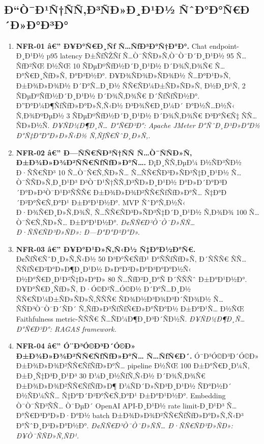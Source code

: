 \documentclass[12pt,A4]{report}
\begin{document}
\subsection{Ð“Ò¯Ð¹Ñ†ÑÑ‚Ð³ÑÐ»Ð¸Ð¹Ð½ ÑˆÐ°Ð°Ñ€Ð´Ð»Ð°Ð³Ð°}

\begin{enumerate}

  \item \textbf{NFR-01 â€” Ð¥Ð°Ñ€Ð¸Ñƒ Ñ…ÑƒÐ³Ð°Ñ†Ð°Ð°.}
        Chat endpoint-Ð¸Ð¹Ð½ p95 latency Ð±ÑƒÑŽÑƒ Ñ…Ò¯ÑÑÐ»Ñ‚Ò¯Ò¯Ð´Ð¸Ð¹Ð½
        95 Ñ…ÑƒÐ²ÑŒ Ð½ÑŒ 10 ÑÐµÐºÑƒÐ½Ð´Ð¸Ð¹Ð½ Ð´Ð¾Ñ‚Ð¾Ñ€ Ñ…Ð°Ñ€Ð¸ÑƒÐ»Ñ‚ Ð°Ð²Ð½Ð°.
        Ð¥Ð¾ÑÐ¾Ð»ÑÐ¾Ð½ Ñ…Ð°Ð¹Ð»Ñ‚ Ð±Ð¾Ð»Ð¾Ð½ Ð´Ð°Ñ…Ð¸Ð½ ÑÑ€ÑÐ¼Ð±ÑÐ»ÑÐ»Ñ‚ Ð½Ð¸Ð¹Ñ‚
        2 ÑÐµÐºÑƒÐ½Ð´Ð¸Ð¹Ð½ Ð´Ð¾Ñ‚Ð¾Ñ€ Ð´ÑƒÑƒÑÐ½Ð°. Ð”Ð°Ð¼Ð¶ÑƒÑƒÐ»Ð°Ð»Ñ‚Ñ‹Ð½ Ð³Ð¾Ñ€Ð¸Ð¼Ð´
        Ð°Ð½Ñ…Ð½Ñ‹ Ñ‚Ð¾ÐºÐµÐ½ 3 ÑÐµÐºÑƒÐ½Ð´Ð¸Ð¹Ð½ Ð´Ð¾Ñ‚Ð¾Ñ€ Ð³Ð°Ñ€Ñ‡ ÑÑ…ÑÐ»Ð½Ñ.
        \textit{Ð¥ÑÐ¼Ð¶Ð¸Ñ… Ð°Ñ€Ð³Ð°: Apache JMeter Ð°ÑˆÐ¸Ð³Ð»Ð°Ð½
        Ð°Ñ‡Ð°Ð°Ð»Ð»Ñ‹Ð½ Ñ‚ÑƒÑ€ÑˆÐ¸Ð»Ñ‚.}

  \item \textbf{NFR-02 â€” Ð—ÑÑ€ÑÐ³Ñ†ÑÑ Ñ…Ò¯ÑÑÐ»Ñ‚ Ð±Ð¾Ð»Ð¾Ð²ÑÑ€ÑƒÑƒÐ»Ð°Ñ….}
        Ð¡Ð¸ÑÑ‚ÐµÐ¼ Ð½ÑÐ³ÑÐ½ Ð·ÑÑ€ÑÐ³ 10 Ñ…Ò¯Ñ€Ñ‚ÑÐ»Ñ… Ñ…ÑÑ€ÑÐ³Ð»ÑÐ³Ñ‡Ð¸Ð¹Ð½
        Ñ…Ò¯ÑÑÐ»Ñ‚Ð¸Ð¹Ð³ Ð³Ò¯Ð¹Ñ†ÑÑ‚Ð³ÑÐ»Ð¸Ð¹Ð½ Ð°Ð»Ð´Ð°Ð³Ð´Ð°Ð»Ð³Ò¯Ð¹Ð³ÑÑÑ€
        Ð±Ð¾Ð»Ð¾Ð²ÑÑ€ÑƒÑƒÐ»Ð°Ñ… Ñ‡Ð°Ð´Ð²Ð°Ñ€Ñ‚Ð°Ð¹ Ð±Ð°Ð¹Ð½Ð°. MVP ÑˆÐ°Ñ‚Ð½Ñ‹
        Ð·Ð¾Ñ€Ð¸Ð»Ñ‚Ð¾Ñ‚ Ñ…ÑÑ€ÑÐ³Ð»ÑÐ³Ñ‡Ð´Ð¸Ð¹Ð½ Ñ‚Ð¾Ð¾ 100 Ñ…Ò¯Ñ€Ñ‚ÑÐ»Ñ… Ð±Ð°Ð¹Ð½Ð°.
        \textit{Ð¢ÑÑ€Ð³Ò¯Ò¯Ð»ÑÑ… Ð·ÑÑ€ÑÐ³Ð»ÑÐ»: Ð—Ð°Ð°Ð²Ð°Ð».}

  \item \textbf{NFR-03 â€” Ð¥Ð°Ð¹Ð»Ñ‚Ñ‹Ð½ Ñ‡Ð°Ð½Ð°Ñ€.}
        Ð¢ÑƒÑ€ÑˆÐ¸Ð»Ñ‚Ñ‹Ð½ 50 Ð³Ð°Ñ€ÑƒÐ¹ Ð°ÑÑƒÑƒÐ»Ñ‚ Ð´ÑÑÑ€ ÑÑ… ÑÑƒÑ€Ð²Ð°Ð»Ð¶Ð¸Ð¹Ð½
        Ð»Ð°Ð²Ð»Ð°Ð³Ð°Ð°Ð½Ñ‹ Ð½Ð°Ñ€Ð¸Ð¹Ð²Ñ‡Ð»Ð°Ð» 80 Ñ…ÑƒÐ²Ð¸Ð°Ñ Ð´ÑÑÑˆ Ð±Ð°Ð¹Ð½Ð°.
        Ð¥Ð°Ñ€Ð¸ÑƒÐ»Ñ‚ Ð·Ó©Ð²Ñ…Ó©Ð½ Ð´Ð°Ñ…Ð¸Ð½ ÑÑ€ÑÐ¼Ð±ÑÐ»ÑÐ»Ñ‚ÑÑÑ€ ÑÐ¾Ð½Ð³Ð¾Ð³Ð´ÑÐ¾Ð½
        Ñ…ÑÑÐ³Ò¯Ò¯Ð´ÑÐ´ Ñ‚ÑƒÐ»Ð³ÑƒÑƒÑ€Ð»Ð°ÑÐ°Ð½ Ð±Ð°Ð¹Ñ… Ð½ÑŒ Faithfulness
        metric-ÑÑÑ€ Ñ…ÑÐ¼Ð¶Ð¸Ð³Ð´ÑÐ½Ñ.
        \textit{Ð¥ÑÐ¼Ð¶Ð¸Ñ… Ð°Ñ€Ð³Ð°: RAGAS framework.}

  \item \textbf{NFR-04 â€” Ó¨Ð³Ó©Ð³Ð´Ó©Ð» Ð±Ð¾Ð»Ð¾Ð²ÑÑ€ÑƒÑƒÐ»Ð°Ñ… Ñ…ÑƒÑ€Ð´.}
        Ó¨Ð³Ó©Ð³Ð´Ó©Ð» Ð±Ð¾Ð»Ð¾Ð²ÑÑ€ÑƒÑƒÐ»Ð°Ñ… pipeline Ð½ÑŒ 100 Ð±Ð°Ñ€Ð¸Ð¼Ñ‚
        Ð±Ð¸Ñ‡Ð³Ð¸Ð¹Ð³ 30 Ð¼Ð¸Ð½ÑƒÑ‚Ñ‹Ð½ Ð´Ð¾Ñ‚Ð¾Ñ€ Ð±Ð¾Ð»Ð¾Ð²ÑÑ€ÑƒÑƒÐ»Ð¶ Ð¼ÑÐ´Ð»ÑÐ³Ð¸Ð¹Ð½
        ÑÐ°Ð½Ð´ Ð½ÑÐ¼ÑÑ… Ñ‡Ð°Ð´Ð²Ð°Ñ€Ñ‚Ð°Ð¹ Ð±Ð°Ð¹Ð½Ð°. Embedding Ò¯Ò¯ÑÐ³ÑÑ…
        Ò¯ÐµÐ´ OpenAI API-Ð¸Ð¹Ð½ rate limit-Ð¸Ð¹Ð³ Ñ…Ð°Ñ€Ð³Ð°Ð»Ð·Ð°Ð½
        batch Ð±Ð¾Ð»Ð¾Ð²ÑÑ€ÑƒÑƒÐ»Ð°Ð»Ñ‚Ñ‹Ð³ Ð°ÑˆÐ¸Ð³Ð»Ð°Ð½Ð°.
        \textit{Ð¢ÑÑ€Ð³Ò¯Ò¯Ð»ÑÑ… Ð·ÑÑ€ÑÐ³Ð»ÑÐ»: Ð¥Ò¯ÑÑÐ»Ñ‚ÑÐ¹.}

\end{enumerate}
\end{document}
